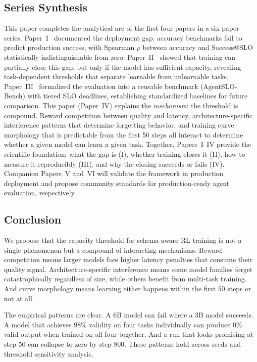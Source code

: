 \documentclass[11pt]{article}
\begin{document}
\subsection{Series Synthesis}

This paper completes the analytical arc of the first four papers in a six-paper series.  Paper~I~\cite{maloney2025deploymentgap} documented the deployment gap: accuracy benchmarks fail to predict production success, with Spearman $\rho$ between accuracy and Success@SLO statistically indistinguishable from zero.  Paper~II~\cite{maloney2025capacity} showed that training can partially close this gap, but only if the model has sufficient capacity, revealing task-dependent thresholds that separate learnable from unlearnable tasks.  Paper~III~\cite{maloney2025agentslobench} formalized the evaluation into a reusable benchmark (AgentSLO-Bench) with tiered SLO deadlines, establishing standardized baselines for future comparison.  This paper (Paper~IV) explains the \emph{mechanism}: the threshold is compound.  Reward competition between quality and latency, architecture-specific interference patterns that determine forgetting behavior, and training curve morphology that is predictable from the first 50 steps all interact to determine whether a given model can learn a given task.  Together, Papers~I--IV provide the scientific foundation: what the gap is (I), whether training closes it (II), how to measure it reproducibly (III), and why the closing succeeds or fails (IV).  Companion Papers~V and~VI will validate the framework in production deployment and propose community standards for production-ready agent evaluation, respectively.

\subsection{Conclusion}

We propose that the capacity threshold for schema-aware RL training is not a single phenomenon but a compound of interacting mechanisms.  Reward competition means larger models face higher latency penalties that consume their quality signal.  Architecture-specific interference means some model families forget catastrophically regardless of size, while others benefit from multi-task training.  And curve morphology means learning either happens within the first 50 steps or not at all.

The empirical patterns are clear.  A 6B model can fail where a 3B model succeeds.  A model that achieves 98\% validity on four tasks individually can produce 0\% valid output when trained on all four together.  And a run that looks promising at step 50 can collapse to zero by step 800.  These patterns hold across seeds and threshold sensitivity analysis.
\end{document}
